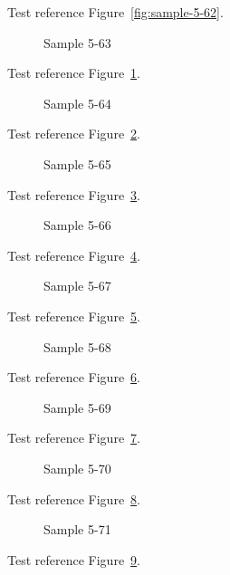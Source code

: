 Test reference Figure~\ref{fig:sample-5-62}.

\begin{figure}[tbhp]
\caption{Sample 5-63}
\label{fig:sample-5-63}
\end{figure}

Test reference Figure~\ref{fig:sample-5-63}.

\begin{figure}[tbhp]
\caption{Sample 5-64}
\label{fig:sample-5-64}
\end{figure}

Test reference Figure~\ref{fig:sample-5-64}.

\begin{figure}[tbhp]
\caption{Sample 5-65}
\label{fig:sample-5-65}
\end{figure}

Test reference Figure~\ref{fig:sample-5-65}.

\begin{figure}[tbhp]
\caption{Sample 5-66}
\label{fig:sample-5-66}
\end{figure}

Test reference Figure~\ref{fig:sample-5-66}.

\begin{figure}[tbhp]
\caption{Sample 5-67}
\label{fig:sample-5-67}
\end{figure}

Test reference Figure~\ref{fig:sample-5-67}.

\begin{figure}[tbhp]
\caption{Sample 5-68}
\label{fig:sample-5-68}
\end{figure}

Test reference Figure~\ref{fig:sample-5-68}.

\begin{figure}[tbhp]
\caption{Sample 5-69}
\label{fig:sample-5-69}
\end{figure}

Test reference Figure~\ref{fig:sample-5-69}.

\begin{figure}[tbhp]
\caption{Sample 5-70}
\label{fig:sample-5-70}
\end{figure}

Test reference Figure~\ref{fig:sample-5-70}.

\begin{figure}[tbhp]
\caption{Sample 5-71}
\label{fig:sample-5-71}
\end{figure}

Test reference Figure~\ref{fig:sample-5-71}.

